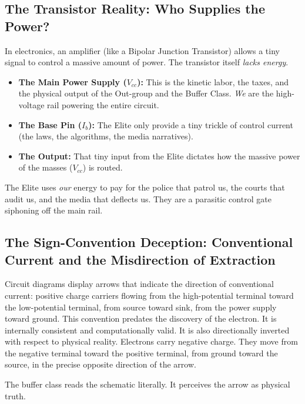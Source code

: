 \subsection{The Transistor Reality: Who Supplies the Power?}

In electronics, an amplifier (like a Bipolar Junction Transistor) allows a tiny signal to control a massive amount of power. The transistor itself \emph{lacks energy}.

\begin{definition}
\begin{itemize}
\item \textbf{The Main Power Supply ($V_{cc}$):} This is the kinetic labor, the taxes, and the physical output of the Out-group and the Buffer Class. \emph{We} are the high-voltage rail powering the entire circuit.
\item \textbf{The Base Pin ($I_b$):} The Elite only provide a tiny trickle of control current (the laws, the algorithms, the media narratives).
\item \textbf{The Output:} That tiny input from the Elite dictates how the massive power of the masses ($V_{cc}$) is routed.
\end{itemize}

The Elite uses \emph{our} energy to pay for the police that patrol us, the courts that audit us, and the media that deflects us. They are a parasitic control gate siphoning off the main rail.
\end{definition}

\subsection{The Sign-Convention Deception: Conventional Current and the Misdirection of Extraction}

Circuit diagrams display arrows that indicate the direction of conventional current: positive charge carriers flowing from the high-potential terminal toward the low-potential terminal, from source toward sink, from the power supply toward ground. This convention predates the discovery of the electron. It is internally consistent and computationally valid. It is also directionally inverted with respect to physical reality. Electrons carry negative charge. They move from the negative terminal toward the positive terminal, from ground toward the source, in the precise opposite direction of the arrow.

The buffer class reads the schematic literally. It perceives the arrow as physical truth.

